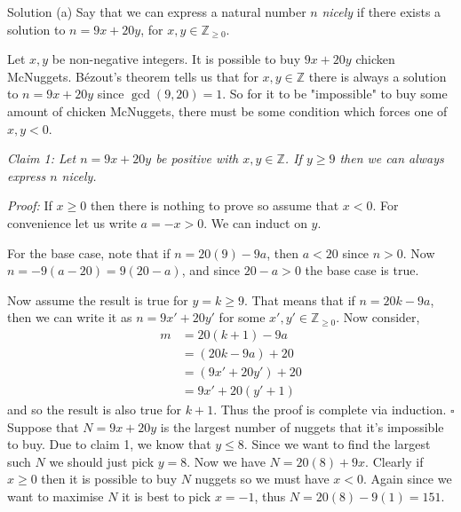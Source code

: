 \documentclass{article}
\begin{document}
\begin{solution}{Solution}
(a) Say that we can express a natural number $n$ \textit{nicely} if there
exists a solution to $n = 9x + 20y$, for $x,y \in \mathbb{Z}_{\geq 0}$.

Let $x,y$ be non-negative integers. It is possible to buy
$9x + 20y$ chicken McNuggets. Bézout's theorem tells us that for
$x, y \in \mathbb{Z}$ there is always a solution to
$n = 9x + 20y$ since $\gcd(9, 20) = 1$. So for it to be "impossible" to
buy some amount of chicken McNuggets, there must be some condition
which forces one of $x, y < 0$. \vspace{0.2cm}

\textit{Claim 1: Let $n = 9x + 20y$ be positive with $x,y \in \mathbb{Z}$.
If $y \geq 9$ then we can always express $n$ nicely.} \vspace{0.2cm}

\textit{Proof:} If $x \geq 0$ then there is nothing to prove so
assume that $x < 0$. For convenience let us write $a = -x > 0$.
We can induct on $y$. \vspace{0.2cm}

For the base case, note that if $n = 20(9) - 9a$, then $a < 20$ since
$n > 0$. Now $n = -9(a - 20) = 9(20-a)$, and since $20-a > 0$ the base
case is true. \vspace{0.2cm}

Now assume the result is true for $y = k \geq 9$. That means that if
$n = 20k - 9a$, then we can write it as $n = 9x' + 20y'$ for some
$x', y' \in \mathbb{Z}_{\geq 0}$. Now consider,
\[
\begin{aligned}
m &= 20(k+1) - 9a \\
&= (20k - 9a) + 20 \\
&= (9x' + 20y') + 20 \\
&= 9x' + 20(y' + 1)
\end{aligned}
\]
and so the result is also true for $k+1$. Thus the proof is complete
via induction. $\square$
\\

Suppose that $N = 9x + 20y$ is the largest number of nuggets that
it's impossible to buy. Due to claim 1, we know that $y \leq 8$. Since we
want to find the largest such $N$ we should just pick $y = 8$. Now we
have $N = 20(8) + 9x$. Clearly if $x \geq 0$ then it is possible to buy
$N$ nuggets so we must have $x < 0$. Again since we want to maximise $N$
it is best to pick $x = -1$, thus $N = 20(8) - 9(1) = 151$. \vspace{0.2cm}


\end{solution}
\end{document}
